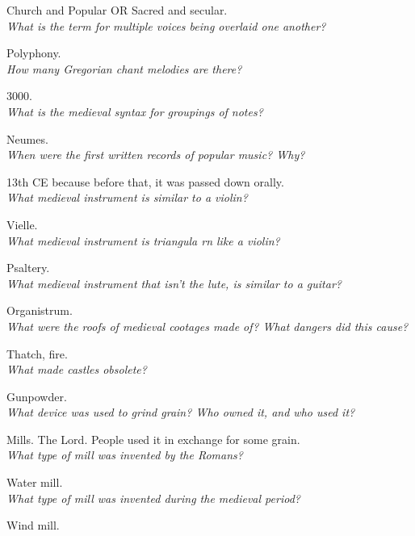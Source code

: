 \documentclass[12pt]{article}
\begin{document}
Church and Popular OR Sacred and secular.\\

\textit{What is the term for multiple voices being overlaid one another?}

Polyphony.\\

\textit{How many Gregorian chant melodies are there?}

3000.\\

\textit{What is the medieval syntax for groupings of notes?}

Neumes.\\

\textit{When were the first written records of popular music? Why?}

13th CE because before that, it was passed down orally.\\

\textit{What medieval instrument is similar to a violin?}

Vielle.\\

\textit{What medieval instrument is triangula rn like a violin?}

Psaltery.\\

\textit{What medieval instrument that isn't the lute, is similar to a guitar?}

Organistrum.\\

\textit{What were the roofs of medieval cootages made of? What dangers did this cause?}

Thatch, fire.\\

\textit{What made castles obsolete?}

Gunpowder.\\

\textit{What device was used to grind grain? Who owned it, and who used it?}

Mills. The Lord. People used it in exchange for some grain. \\

\textit{What type of mill was invented by the Romans?}

Water mill.\\

\textit{What type of mill was invented during the medieval period?}

Wind mill.\\
\end{document}
